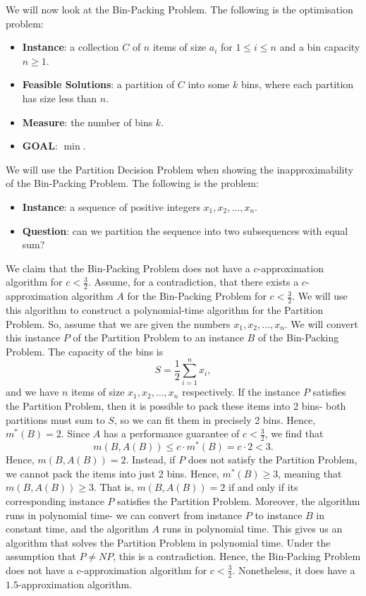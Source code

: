 \documentclass[a4paper, openany]{memoir}
\begin{document}
    We will now look at the Bin-Packing Problem. The following is the optimisation problem:
    \begin{itemize}
        \item \textbf{Instance}: a collection $C$ of $n$ items of size $a_i$ for $1 \leq i \leq n$ and a bin capacity $n \geq 1$.
        \item \textbf{Feasible Solutions}: a partition of $C$ into some $k$ bins, where each partition has size less than $n$.
        \item \textbf{Measure}: the number of bins $k$.
        \item \textbf{GOAL}: $\min$.
    \end{itemize}


    We will use the Partition Decision Problem when showing the inapproximability of the Bin-Packing Problem. The following is the problem:
    \begin{itemize}
        \item \textbf{Instance}: a sequence of positive integers $x_1, x_2, \dots, x_n$.
        \item \textbf{Question}: can we partition the sequence into two subsequences with equal sum?
    \end{itemize}

    We claim that the Bin-Packing Problem does not have a $c$-approximation algorithm for $c < \frac{3}{2}$. Assume, for a contradiction, that there exists a $c$-approximation algorithm $A$ for the Bin-Packing Problem for $c < \frac{3}{2}$. We will use this algorithm to construct a polynomial-time algorithm for the Partition Problem. So, assume that we are given the numbers $x_1, x_2, \dots, x_n$. We will convert this instance $P$ of the Partition Problem to an instance $B$ of the Bin-Packing Problem. The capacity of the bins is 
    \[S = \frac{1}{2} \sum_{i=1}^n x_i,\]
    and we have $n$ items of size $x_1, x_2, \dots, x_n$ respectively. If the instance $P$ satisfies the Partition Problem, then it is possible to pack these items into 2 bins- both partitions must sum to $S$, so we can fit them in precisely 2 bins. Hence, $m^*(B) = 2$. Since $A$ has a performance guarantee of $c < \frac{3}{2}$, we find that
    \[m(B, A(B)) \leq c \cdot m^*(B) = c \cdot 2 < 3.\]
    Hence, $m(B, A(B)) = 2$. Instead, if $P$ does not satisfy the Partition Problem, we cannot pack the items into just 2 bins. Hence, $m^*(B) \geq 3$, meaning that $m(B, A(B)) \geq 3$. That is, $m(B, A(B)) = 2$ if and only if its corresponding instance $P$ satisfies the Partition Problem. Moreover, the algorithm runs in polynomial time- we can convert from instance $P$ to instance $B$ in constant time, and the algorithm $A$ runs in polynomial time. This gives us an algorithm that solves the Partition Problem in polynomial time. Under the assumption that $P \neq NP$, this is a contradiction. Hence, the Bin-Packing Problem does not have a $c$-approximation algorithm for $c < \frac{3}{2}$. Nonetheless, it does have a $1.5$-approximation algorithm.
\end{document}
